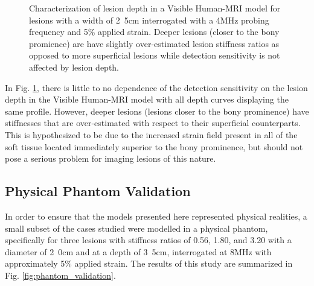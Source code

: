 			\begin{figure}[!t]
				\centering
				\caption{Characterization of lesion depth in a Visible Human-MRI model for lesions with a width of \unit{2.5}{cm} interrogated with a \unit{4}{MHz} probing frequency and \unit{5}{\%} applied strain. Deeper lesions (closer to the bony promience) are have slightly over-estimated lesion stiffness ratios as opposed to more superficial lesions while detection sensitivity is not affected by lesion depth.}
				\label{fig:human_depth_characterization}
			\end{figure}

			In Fig. \ref{fig:human_depth_characterization}, there is little to no dependence of the detection sensitivity on the lesion depth in the Visible Human-MRI model with all depth curves displaying the same profile. However, deeper lesions (lesions closer to the bony prominence) have stiffnesses that are over-estimated with respect to their superficial counterparts. This is hypothesized to be due to the increased strain field present in all of the soft tissue located immediately superior to the bony prominence, but should not pose a serious problem for imaging lesions of this nature.

		\subsection{Physical Phantom Validation}
			In order to ensure that the models presented here represented physical realities, a small subset of the cases studied were modelled in a physical phantom, specifically for three lesions with stiffness ratios of 0.56, 1.80, and 3.20 with a diameter of \unit{2.0}{cm} and at a depth of \unit{3.5}{cm}, interrogated at \unit{8}{MHz} with approximately \unit{5}{\%} applied strain. The results of this study are summarized in Fig. \ref{fig:phantom_validation}.

